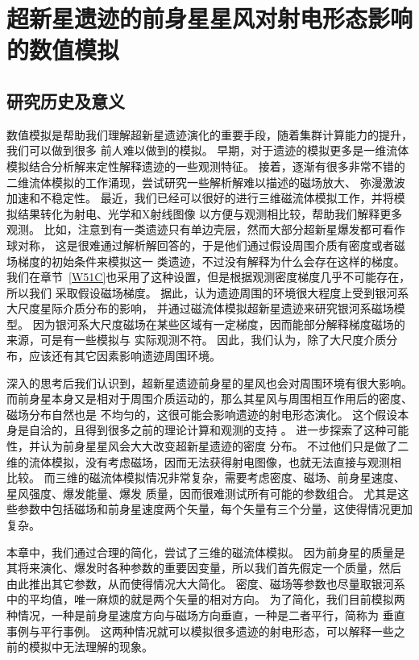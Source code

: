 \chapter{超新星遗迹的前身星星风对射电形态影响的数值模拟}
\label{SW}

\section{研究历史及意义}
\label{SWintro}
数值模拟是帮助我们理解超新星遗迹演化的重要手段，随着集群计算能力的提升，我们可以做到很多
前人难以做到的模拟。
早期，对于遗迹的模拟更多是一维流体模拟结合分析解来定性解释遗迹的一些观测特征。
接着，逐渐有很多非常不错的二维流体模拟的工作涌现，尝试研究一些解析解难以描述的磁场放大、
弥漫激波加速和不稳定性\citep{Jun1996,Kang2006,Fang2012}。
最近，我们已经可以很好的进行三维磁流体模拟工作，并将模拟结果转化为射电、光学和X射线图像
以方便与观测相比较\citep{Orlando2007,Meyer2015,Zhang2017}，帮助我们解释更多观测。
比如，\citet{Orlando2007}注意到有一类遗迹只有单边壳层，然而大部分超新星爆发都可看作球对称，
这是很难通过解析解回答的，于是他们通过假设周围介质有密度或者磁场梯度的初始条件来模拟这一
类遗迹，不过没有解释为什么会存在这样的梯度。
我们在章节~\ref{W51C}也采用了这种设置，但是根据观测密度梯度几乎不可能存在，所以我们
采取假设磁场梯度。
据此，\citet{West2016}认为遗迹周围的环境很大程度上受到银河系大尺度星际介质分布的影响，
并通过磁流体模拟超新星遗迹来研究银河系磁场模型。
因为银河系大尺度磁场在某些区域有一定梯度，因而能部分解释梯度磁场的来源，可是有一些模拟与
实际观测不符。
因此，我们认为，除了大尺度介质分布，应该还有其它因素影响遗迹周围环境。

深入的思考后我们认识到，超新星遗迹前身星的星风也会对周围环境有很大影响。
而前身星本身又是相对于周围介质运动的，那么其星风与周围相互作用后的密度、磁场分布自然也是
不均匀的，这很可能会影响遗迹的射电形态演化。
这个假设本身是自洽的，且得到很多之前的理论计算和观测的支持
\citep{Chevalier1989,Chen1995,Zhang1996,Foster2004,Lee2010}。
\citet{Meyer2015}进一步探索了这种可能性，并认为前身星星风会大大改变超新星遗迹的密度
分布。
不过他们只是做了二维的流体模拟，没有考虑磁场，因而无法获得射电图像，也就无法直接与观测相
比较。
而三维的磁流体模拟情况非常复杂，需要考虑密度、磁场、前身星速度、星风强度、爆发能量、爆发
质量，因而很难测试所有可能的参数组合。
尤其是这些参数中包括磁场和前身星速度两个矢量，每个矢量有三个分量，这使得情况更加复杂。

本章中，我们通过合理的简化，尝试了三维的磁流体模拟。
因为前身星的质量是其将来演化、爆发时各种参数的重要因变量，所以我们首先假定一个质量，然后
由此推出其它参数，从而使得情况大大简化。
密度、磁场等参数也尽量取银河系中的平均值，唯一麻烦的就是两个矢量的相对方向。
为了简化，我们目前模拟两种情况，一种是前身星速度方向与磁场方向垂直，一种是二者平行，简称为
垂直事例与平行事例。
这两种情况就可以模拟很多遗迹的射电形态，可以解释一些之前的模拟中无法理解的现象。


